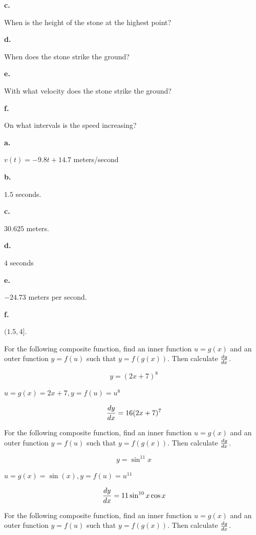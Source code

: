 {\par \bf c.} When is the height of the stone at the highest point?

{\par \bf d.} When does the stone strike the ground?

{\par \bf e.} With what velocity does the stone strike the ground?

{\par \bf f.} On what intervals is the speed increasing?

\bigskip

{\par \bf a.} $v(t) = -9.8t + 14.7$ meters/second

{\par \bf b.} $1.5$ seconds.

{\par \bf c.} $30.625$ meters.

{\par \bf d.} $4$ seconds

{\par \bf e.} $-24.73$ meters per second.

{\par \bf f.} $(1.5, 4]$.

\bigskip

\bigskip

For the following composite function, find an inner function
$u = g(x)$ and an outer function $y = f(u)$ such that
$y = f(g(x))$. Then calculate $dy \over dx$.

$$\
y = (2x + 7)^8
$$

$u = g(x) = 2x + 7, y = f(u) = u^8$

$$\
{dy \over dx} = 16(2x + 7)^7
$$

\bigskip

For the following composite function, find an inner function
$u = g(x)$ and an outer function $y = f(u)$ such that
$y = f(g(x))$. Then calculate $dy \over dx$.

$$\
y = \sin^{11}x
$$

$u = g(x) = \sin(x), y = f(u) = u^{11}$

$$\
{dy \over dx} = 11\sin^{10} x \cos x
$$
\bigskip

For the following composite function, find an inner function
$u = g(x)$ and an outer function $y = f(u)$ such that
$y = f(g(x))$. Then calculate $dy \over dx$.

